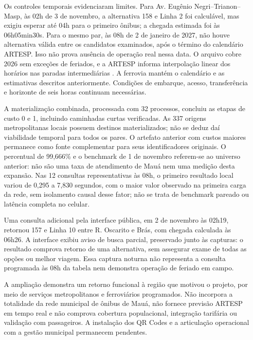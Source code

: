 Os controles temporais evidenciaram limites. Para Av. Eugênio Negri--Trianon--Masp, às 02h de 3 de novembro, a alternativa 158 e Linha 2 foi calculável, mas exigiu esperar até 04h para o primeiro ônibus; a chegada estimada foi às 06h05min30s. Para o mesmo par, às 08h de 2 de janeiro de 2027, não houve alternativa válida entre os candidatos examinados, após o término do calendário ARTESP. Isso não prova ausência de operação real nessa data. O arquivo cobre 2026 sem exceções de feriados, e a ARTESP informa interpolação linear dos horários nas paradas intermediárias \citep{artespgtfs2026}. A ferrovia mantém o calendário e as estimativas descritos anteriormente. Condições de embarque, acesso, transferência e horizonte de seis horas continuam necessárias.

A materialização combinada, processada com 32 processos, concluiu as etapas de custo 0 e 1, incluindo caminhadas curtas verificadas. As 337 origens metropolitanas locais possuem destinos materializados; não se deduz daí viabilidade temporal para todos os pares. O artefato anterior com custos maiores permanece como fonte complementar para seus identificadores originais. O percentual de 99,666\% e o benchmark de 1 de novembro referem-se ao universo anterior: não são uma taxa de atendimento de Mauá nem uma medição desta expansão. Nas 12 consultas representativas às 08h, o primeiro resultado local variou de 0,295 a 7,830 segundos, com o maior valor observado na primeira carga da rede, sem isolamento causal desse fator; não se trata de benchmark pareado ou latência completa no celular.

Uma consulta adicional pela interface pública, em 2 de novembro às 02h19, retornou 157 e Linha 10 entre R. Oscarito e Brás, com chegada calculada às 06h26. A interface exibiu aviso de busca parcial, preservado junto às capturas: o resultado comprova retorno de uma alternativa, sem assegurar exame de todas as opções ou melhor viagem. Essa captura noturna não representa a consulta programada às 08h da tabela nem demonstra operação de feriado em campo.

A ampliação demonstra um retorno funcional à região que motivou o projeto, por meio de serviços metropolitanos e ferroviários programados. Não incorpora a totalidade da rede municipal de ônibus de Mauá, não fornece previsão ARTESP em tempo real e não comprova cobertura populacional, integração tarifária ou validação com passageiros. A instalação dos QR Codes e a articulação operacional com a gestão municipal permanecem pendentes.
